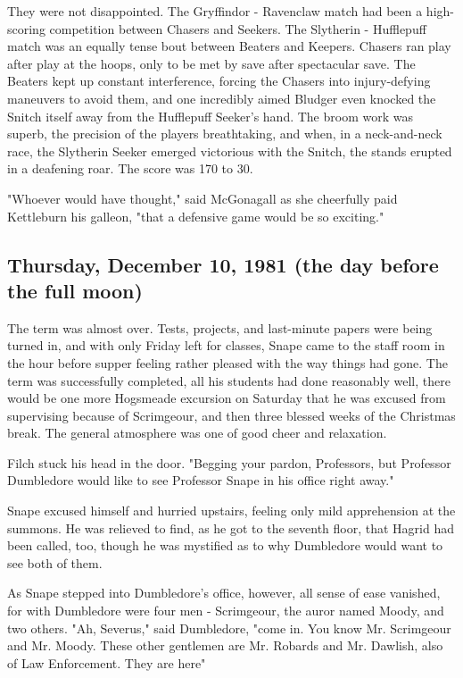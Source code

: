 They were not disappointed. The Gryffindor - Ravenclaw match had been a high-scoring competition between Chasers and Seekers. The Slytherin - Hufflepuff match was an equally tense bout between Beaters and Keepers. Chasers ran play after play at the hoops, only to be met by save after spectacular save. The Beaters kept up constant interference, forcing the Chasers into injury-defying maneuvers to avoid them, and one incredibly aimed Bludger even knocked the Snitch itself away from the Hufflepuff Seeker's hand. The broom work was superb, the precision of the players breathtaking, and when, in a neck-and-neck race, the Slytherin Seeker emerged victorious with the Snitch, the stands erupted in a deafening roar. The score was 170 to 30.

"Whoever would have thought," said McGonagall as she cheerfully paid Kettleburn his galleon, "that a defensive game would be so exciting."

\subsection{Thursday, December 10, 1981 (the day before the full moon)}

The term was almost over. Tests, projects, and last-minute papers were being turned in, and with only Friday left for classes, Snape came to the staff room in the hour before supper feeling rather pleased with the way things had gone. The term was successfully completed, all his students had done reasonably well, there would be one more Hogsmeade excursion on Saturday that he was excused from supervising because of Scrimgeour, and then three blessed weeks of the Christmas break. The general atmosphere was one of good cheer and relaxation.

Filch stuck his head in the door. "Begging your pardon, Professors, but Professor Dumbledore would like to see Professor Snape in his office right away."

Snape excused himself and hurried upstairs, feeling only mild apprehension at the summons. He was relieved to find, as he got to the seventh floor, that Hagrid had been called, too, though he was mystified as to why Dumbledore would want to see both of them.

As Snape stepped into Dumbledore's office, however, all sense of ease vanished, for with Dumbledore were four men - Scrimgeour, the auror named Moody, and two others. "Ah, Severus," said Dumbledore, "come in. You know Mr. Scrimgeour and Mr. Moody. These other gentlemen are Mr. Robards and Mr. Dawlish, also of Law Enforcement. They are here{\el}"

